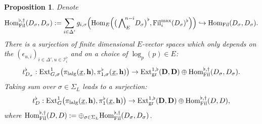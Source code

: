 \documentclass[10pt]{article}
\newtheorem{pro}[thm]{Proposition}
\newcommand{\fil}{{\rm Fil}}
\newcommand{\homo}{{\rm Hom}}
\newcommand{\ext}{{\rm Ext}}
\newcommand{\lalg}{{\rm lalg}}
\newcommand{\gr}{{\rm gr}}
\newcommand{\Dpik}{{\mathbf{D}}}
\newcommand{\bh}{{\mathbf{h}}}
\newcommand{\cI}{\mathcal I}
\begin{document}
\begin{pro}\label{construext1}Denote
	\begin{equation}
		\homo^{\flat,\dagger}_{\fil}(D_{\sigma},D_{\sigma}):=\sum_{i\in \Delta'}g_{i,\sigma}\Big(\homo_E\Big(\big(\bigwedge\nolimits_{E}^{\!n-i}\!D_{\sigma}\big)^{\flat},\fil_i^{\max}(D_{\sigma})^{\flat}\Big)\Big)\hookrightarrow \homo_{\fil}(D_{\sigma},D_{\sigma}).
	\end{equation}
There is a surjection of finite dimensional $E$-vector spaces which only depends on the $(\epsilon_{u,i})_{i\in \Delta',u\in \cI_{i}^{\flat}}$ and  on a choice of $\log_p(p)\in E$:
\[t^{\flat}_{D_{\sigma}}:\ext^1_{G,\sigma}\big(\pi_{\lalg}(\underline{x},\bh),\pi^{\flat}_{1,\sigma}(\underline{x},\bh)\big)\rightarrow\ext^{1,\flat}_{\gr}({\Dpik},{\Dpik})\oplus\homo^{\flat,\dagger}_{\fil}(D_{\sigma},D_{\sigma}).\]
Taking sum over $\sigma\in \Sigma_L$ leads to a surjection:
\[t^{\flat}_{D}:\ext^1_{G}\big(\pi_{\lalg}(\underline{x},\bh),\pi^{\flat}_{1}(\underline{x},\bh)\big)\rightarrow\ext^{1,\flat}_{\gr}({\Dpik},{\Dpik})\oplus\homo^{\flat,\dagger}_{\fil}(D,D),\]
where $\homo^{\flat,\dagger}_{\fil}(D,D):=\oplus_{\sigma\in \Sigma_L}\homo^{\flat,\dagger}_{\fil}(D_{\sigma},D_{\sigma})$.\;
\end{pro}
\end{document}
